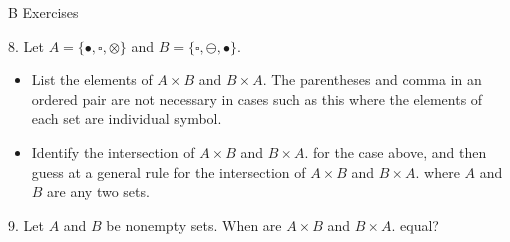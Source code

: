 \documentclass[10pt,]{book}
\theoremstyle{plain}
\theoremstyle{definition}
\begin{document}
\par\smallskip\noindent
\hypertarget{exercisegroup-6}{}\typeout{************************************************}
\typeout{************************************************}
B Exercises%
\begin{exercisegroup}
\item[8.]\hypertarget{exercise-22}{} 
Let \(A = \{\bullet,\square ,\otimes \}\) and \(B = \{\square ,\ominus ,\bullet\}\). 
\leavevmode%
\begin{itemize}[label=\textbullet]
\item{} List the elements of \(A \times  B\) and \(B \times  A\). The parentheses and comma in an ordered pair are not necessary in cases such as this where the elements of each set are individual symbol. \item{}  Identify the intersection of \(A \times  B\) and \(B \times  A\). for the case above, and then guess at a general rule for the intersection of \(A \times  B\) and \(B \times  A\). where \( A\) and \( B\) are any two sets. \end{itemize}
\par\smallskip
\item[9.]\hypertarget{exercise-23}{} 
Let \(A\) and \(B\) be nonempty sets. When are \(A \times  B\) and \(B \times  A\). equal? 
\par\smallskip
\end{exercisegroup}
\par\smallskip\noindent
\typeout{************************************************}
\typeout{************************************************}
\end{document}
